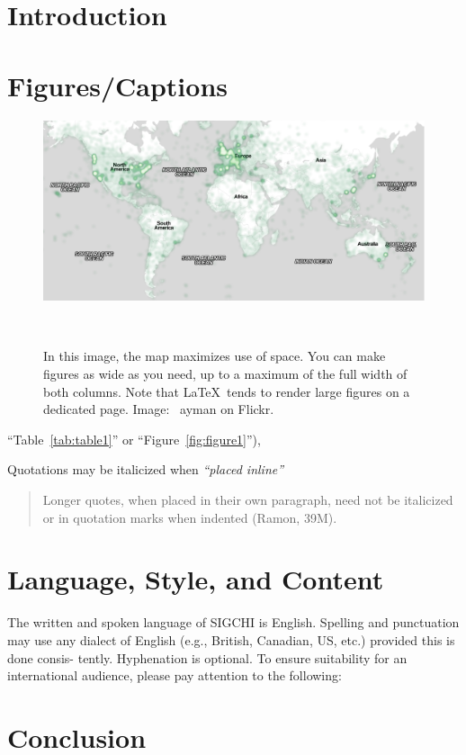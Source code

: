\documentclass[../main/Feedback.tex]{subfiles}
\begin{document}
\section{Introduction}

\section{Figures/Captions}

\begin{figure}
  \centering
  \includegraphics[width=1.75\columnwidth]{../figures/map}
  \caption{In this image, the map maximizes use of space. You can make
    figures as wide as you need, up to a maximum of the full width of
    both columns. Note that \LaTeX\ tends to render large figures on a
    dedicated page. Image: \ccbynd~ayman on
    Flickr.}~\label{fig:figure2}
\end{figure}

 ``Table~\ref{tab:table1}'' or
``Figure~\ref{fig:figure1}''),

Quotations may be italicized when \textit{``placed inline''}

\begin{quote}
Longer quotes, when placed in their own paragraph, need not be
italicized or in quotation marks when indented (Ramon, 39M).
\end{quote}

\section{Language, Style, and Content}

The written and spoken language of SIGCHI is English. Spelling and
punctuation may use any dialect of English (e.g., British, Canadian,
US, etc.) provided this is done consis- tently. Hyphenation is
optional. To ensure suitability for an international audience, please
pay attention to the following:

\section{Conclusion}




\end{document}
